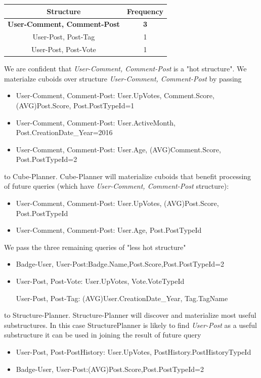 \begin{center}
	\begin{tabular}{ | c | c |}  
		\hline
		Structure	&Frequency	\\ \hline 
		\textbf{User-Comment, Comment-Post} 	&\textbf{3} \\ \hline
		User-Post, Post-Tag 	&1 \\ \hline
		User-Post, Post-Vote	&1 \\ \hline
	\end{tabular}
	\end {center}
\par	
We are confident that \textit{User-Comment, Comment-Post} is a "hot structure". We materialze cuboids over structure \textit{User-Comment, Comment-Post} by passing
\begin{itemize}
\item User-Comment, Comment-Post: User.UpVotes, Comment.Score, (AVG)Post.Score, Post.PostTypeId=1

\item User-Comment, Comment-Post: User.ActiveMonth, Post.CreationDate\_Year=2016

\item User-Comment, Comment-Post: User.Age, (AVG)Comment.Score, Post.PostTypeId=2
\end{itemize}
to Cube-Planner. Cube-Planner will materialize cuboids that benefit processing of future queries (which have \textit{User-Comment, Comment-Post} structure):

\begin{itemize}
\item User-Comment, Comment-Post: User.UpVotes, (AVG)Post.Score, Post.PostTypeId

\item User-Comment, Comment-Post: User.Age, Post.PostTypeId
\end{itemize}
\par
We pass the three remaining queries of "less hot structure" 
\begin{itemize}
\item Badge-User, User-Post:Badge.Name,Post.Score,Post.PostTypeId=2

\item User-Post, Post-Vote: User.UpVotes, Vote.VoteTypeId

User-Post, Post-Tag: (AVG)User.CreationDate\_Year, Tag.TagName
\end{itemize}
to Structure-Planner. Structure-Planner will discover and materialize most useful substructures. In this case StructurePlanner is likely to find \textit{User-Post} as a useful substructure it can be used in joining the result of future query
\begin{itemize}
\item User-Post, Post-PostHistory: User.UpVotes, PostHistory.PostHistoryTypeId
\item Badge-User, User-Post:(AVG)Post.Score,Post.PostTypeId=2
\end{itemize}
